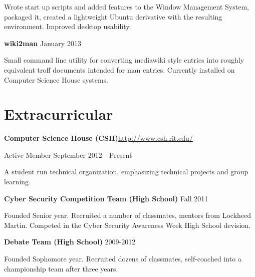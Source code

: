 \documentclass[letter,margin,line]{resume}
\newcommand{\rurl}[1]{\hfill {\footnotesize \url{#1}}}
\begin{document}
\begin{resume}
\begin{asparablank}
		\small Wrote start up scripts and added features to the Window Management System, packaged it, created a lightweight Ubuntu derivative with the resulting environment. Improved desktop usability.  
		\normalsize
		\\
		
		\item {\bf wiki2man} \hfill January 2013
		
		\small Small command line utility for converting mediawiki style entries into roughly equivalent troff documents intended for man entries. Currently installed on Computer Science House systems.
		\normalsize
		\\
	\end{asparablank}

\section{\mysidestyle Extracurricular}
	\begin{asparablank}
		\item {\bf Computer Science House ({\small CSH})}\rurl{http://www.csh.rit.edu/}
		\small	\item Active Member \hfill September 2012 - Present
				\item A student run technical organization, emphasizing technical projects and group learning. 
		\\
		\item {\bf Cyber Security Competition Team ({\small High School})} \hfill Fall 2011
		\small \item Founded Senior year. Recruited a number of classmates, mentors from Lockheed Martin. Competed in the Cyber Security Awareness Week High School devision. 
		\\
		\item {\bf Debate Team ({\small High School})} \hfill 2009-2012
		\small \item Founded Sophomore year. Recruited dozens of classmates, self-coached into a championship team after three years.
	\end{asparablank}

\end{resume}
\end{document}

